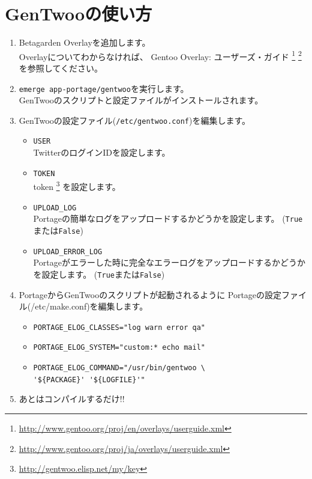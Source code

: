 \documentclass[10pt,foldmark,notumble]{leaflet}
\begin{document}
\section{GenTwooの使い方}
	\begin{enumerate}
		\item Betagarden Overlayを追加します。 \\
			Overlayについてわからなければ、
			Gentoo Overlay: ユーザーズ・ガイド
			\footnote{\url{http://www.gentoo.org/proj/en/overlays/userguide.xml}}
			\footnote{\url{http://www.gentoo.org/proj/ja/overlays/userguide.xml}}
			を参照してください。
		\item \verb|emerge app-portage/gentwoo|を実行します。 \\
			GenTwooのスクリプトと設定ファイルがインストールされます。
		\item GenTwooの設定ファイル(\verb|/etc/gentwoo.conf|)を編集します。
			\begin{itemize}
				\item \verb|USER| \\
					TwitterのログインIDを設定します。
				\item \verb|TOKEN| \\
					token
					\footnote{\url{http://gentwoo.elisp.net/my/key}}
					を設定します。
				\item \verb|UPLOAD_LOG| \\
					Portageの簡単なログをアップロードするかどうかを設定します。
					(\verb|True|または\verb|False|)
				\item \verb|UPLOAD_ERROR_LOG| \\
					Portageがエラーした時に完全なエラーログをアップロードするかどうかを設定します。
					(\verb|True|または\verb|False|)
			\end{itemize}
		\item PortageからGenTwooのスクリプトが起動されるように
			Portageの設定ファイル(/etc/make.conf)を編集します。
			\begin{itemize}
				\item \verb|PORTAGE_ELOG_CLASSES="log warn error qa"|
				\item \verb|PORTAGE_ELOG_SYSTEM="custom:* echo mail"|
				\item \verb|PORTAGE_ELOG_COMMAND="/usr/bin/gentwoo \| \\
					\hspace{25mm} \verb|'${PACKAGE}' '${LOGFILE}'"|
			\end{itemize}
		\item あとはコンパイルするだけ!!
	\end{enumerate}
\newpage
\end{document}
